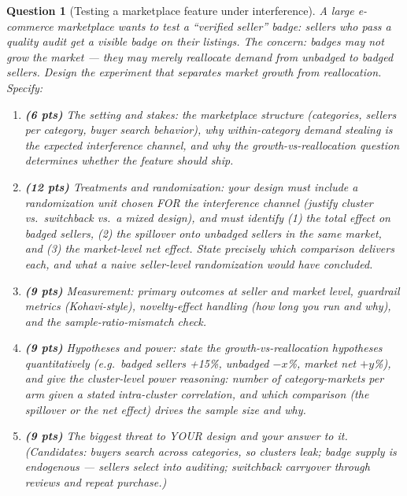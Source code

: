 \documentclass[11pt]{article}
\newtheorem{question}{Question}
\begin{document}
\begin{question}[Testing a marketplace feature under interference]
A large e-commerce marketplace wants to test a ``verified seller''
badge: sellers who pass a quality audit get a visible badge on their
listings. The concern: badges may not grow the market --- they may
merely reallocate demand from unbadged to badged sellers. Design the
experiment that separates market growth from reallocation. Specify:
\begin{enumerate}[label=(\alph*)]
  \item \textbf{(6 pts)} The setting and stakes: the marketplace
        structure (categories, sellers per category, buyer search
        behavior), why within-category demand stealing is the expected
        interference channel, and why the growth-vs-reallocation
        question determines whether the feature should ship.
  \item \textbf{(12 pts)} Treatments and randomization: your design
        must include a randomization unit chosen FOR the interference
        channel (justify cluster vs.\ switchback vs.\ a mixed design),
        and must identify (1) the total effect on badged sellers,
        (2) the spillover onto unbadged sellers in the same market,
        and (3) the market-level net effect. State precisely which
        comparison delivers each, and what a naive seller-level
        randomization would have concluded.
  \item \textbf{(9 pts)} Measurement: primary outcomes at seller and
        market level, guardrail metrics (Kohavi-style), novelty-effect
        handling (how long you run and why), and the
        sample-ratio-mismatch check.
  \item \textbf{(9 pts)} Hypotheses and power: state the
        growth-vs-reallocation hypotheses quantitatively (e.g.\ badged
        sellers +15\%, unbadged $-x$\%, market net $+y$\%), and give
        the cluster-level power reasoning: number of category-markets
        per arm given a stated intra-cluster correlation, and which
        comparison (the spillover or the net effect) drives the sample
        size and why.
  \item \textbf{(9 pts)} The biggest threat to YOUR design and your
        answer to it. (Candidates: buyers search across categories, so
        clusters leak; badge supply is endogenous --- sellers select
        into auditing; switchback carryover through reviews and repeat
        purchase.)
\end{enumerate}
\end{question}
\end{document}
